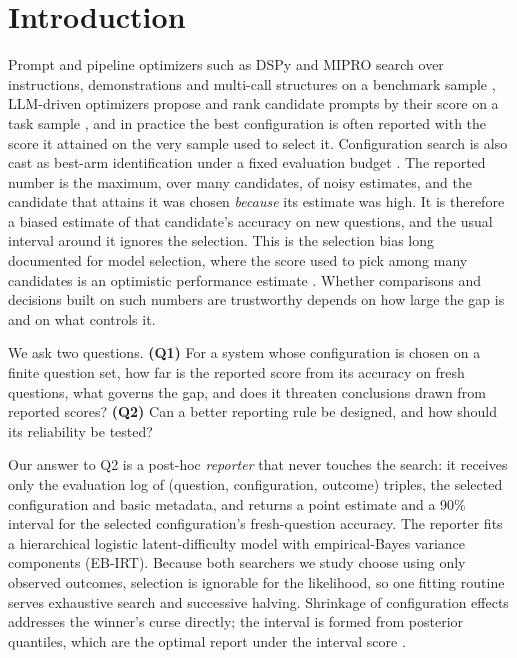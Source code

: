 \documentclass{article}
\begin{document}
\section{Introduction}
Prompt and pipeline optimizers such as DSPy and MIPRO search over instructions, demonstrations and multi-call structures on a benchmark sample \citep{Khattab2023DSPy,OpsahlOng2024MIPRO}, LLM-driven optimizers propose and rank candidate prompts by their score on a task sample \citep{Zhou2022APE,Yang2023OPRO}, and in practice the best configuration is often reported with the score it attained on the very sample used to select it. Configuration search is also cast as best-arm identification under a fixed evaluation budget \citep{Shi2024PromptBAI}. The reported number is the maximum, over many candidates, of noisy estimates, and the candidate that attains it was chosen \emph{because} its estimate was high. It is therefore a biased estimate of that candidate's accuracy on new questions, and the usual interval around it ignores the selection. This is the selection bias long documented for model selection, where the score used to pick among many candidates is an optimistic performance estimate \citep{Cawley2010Overfitting}. Whether comparisons and decisions built on such numbers are trustworthy depends on how large the gap is and on what controls it.

We ask two questions. \textbf{(Q1)} For a system whose configuration is chosen on a finite question set, how far is the reported score from its accuracy on fresh questions, what governs the gap, and does it threaten conclusions drawn from reported scores? \textbf{(Q2)} Can a better reporting rule be designed, and how should its reliability be tested?

Our answer to Q2 is a post-hoc \emph{reporter} that never touches the search: it receives only the evaluation log of (question, configuration, outcome) triples, the selected configuration and basic metadata, and returns a point estimate and a 90\% interval for the selected configuration's fresh-question accuracy. The reporter fits a hierarchical logistic latent-difficulty model with empirical-Bayes variance components (EB-IRT). Because both searchers we study choose using only observed outcomes, selection is ignorable for the likelihood, so one fitting routine serves exhaustive search and successive halving. Shrinkage of configuration effects addresses the winner's curse directly; the interval is formed from posterior quantiles, which are the optimal report under the interval score \citep{Gneiting2007Scoring}.
\end{document}
